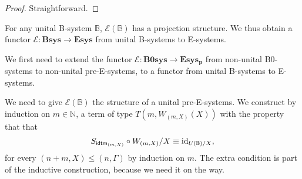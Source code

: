 \begin{proof}
Straightforward.
\end{proof}

\begin{defn}
For any unital B-system $\mathbb{B}$, $\mathcal{E}(\mathbb{B})$ has a
projection structure. We thus obtain a functor 
$\mathcal{E}:\mathbf{Bsys}\to\mathbf{Esys}$ from unital B-systems to E-systems.
\end{defn}

\begin{constr}
We first need to extend the functor $\mathcal{E}:\mathbf{B0sys}\to\mathbf{Esys_p}$
from non-unital B0-systems to non-unital pre-E-systems, to a functor from
unital B-systems to E-systems.

We need to give $\mathcal{E}(\mathbb{B})$ the structure of a unital
pre-E-systems. We construct by induction on $m\in \mathbb{N}$, a term of type 
$T(m,W_{(m,X)}(X))$ with the property that that 
\begin{equation*}
S_{\tfid{(m,X)}}\circ W_{(m,X)}/X\jdeq\catid{U(\mathbb{B})/X},
\end{equation*} 
for every $(n+m,X)\leq (n,\Gamma)$ by induction on $m$. The extra
condition is part of the inductive construction, because we need it on the way.


\end{constr}

